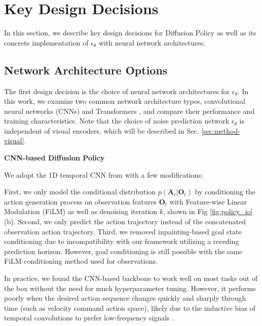   
\section{Key Design Decisions}
 In this section, we describe key design decisions for Diffusion Policy as well as its concrete implementation of $\epsilon_\theta$ with neural network architectures.
 
\subsection{Network Architecture Options}
\label{sec:method-network}
The first design decision is the choice of neural network architectures for $\epsilon_\theta$. 
In this work, we examine two common network architecture types, convolutional neural networks (CNNs) \cite{ronneberger2015u} and Transformers \cite{vaswani2017attention}, and compare their performance and training characteristics. Note that the choice of noise prediction network $\epsilon_\theta$ is independent of visual encoders, which will be described in Sec. \ref{sec:method-visual}.

\textbf{CNN-based Diffusion Policy} 

We adopt the 1D temporal CNN from \citet{pmlr-v162-janner22a} with a few modifications:

First, we only model the conditional distribution $p(\mathbf{A}_t|\mathbf{O}_t)$ by conditioning the action generation process on observation features $\mathbf{O}_t$ with Feature-wise Linear Modulation (FiLM) \cite{perez2018film} as well as denoising iteration $k$, shown in Fig \ref{fig:policy_io} (b).
Second, we only predict the action trajectory instead of the concatenated observation action trajectory. 
Third, we removed inpainting-based goal state conditioning due to incompatibility with our framework utilizing a receding prediction horizon. However, goal conditioning is still possible with the same FiLM conditioning method used for observations.










In practice, we found the CNN-based backbone to work well on most tasks out of the box without the need for much hyperparameter tuning. However, it performs poorly when the desired action sequence changes quickly and sharply through time (such as velocity command action space), likely due to the inductive bias of temporal convolutions to prefer low-frequency signals \cite{tancik2020fourier}. 

